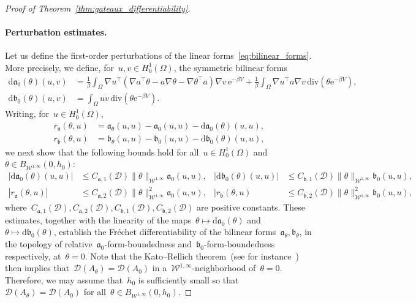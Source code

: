 \documentclass[a4]{article}
\renewcommand{\d}{\mathrm{d}}
\newcommand{\e}{\mathrm{e}}
\renewcommand{\div}{\mathrm{div}}
\newcommand{\fa}{\mathfrak{a}}
\newcommand{\fb}{\mathfrak{b}}
\newcommand{\1}{\mathbbm 1}
\newcommand{\Winf}{{{\cW}^{1,\infty}}}
\newcommand{\cW}{\mathcal{W}}
\begin{document}
\begin{proof}[Proof of Theorem~\ref{thm:gateaux_differentiability}]
    \paragraph{Perturbation estimates.}
    Let us define the first-order perturbations of the linear forms~\eqref{eq:bilinear_forms}. More precisely, we define, for~$u,v\in H_0^1(\Omega)$, the symmetric bilinear forms
    \begin{equation}
        \label{eq:perturbations}
        \begin{aligned}
        \d \fa_0(\theta)(u,v) &= \frac1\beta\int_\Omega \nabla u^\top \left(\nabla a^\top \theta -a\nabla \theta -\nabla\theta^\top a\right)\nabla v\,\e^{-\beta V}+ \frac1\beta \int_\Omega \nabla u^\top a \nabla v\,\div\left(\theta\e^{-\beta V}\right),\\
        \d \fb_0(\theta)(u,v) &= \int_\Omega uv\,\div(\theta \e^{-\beta V}).
        \end{aligned}
    \end{equation}
    Writing, for~$u\in H_0^1(\Omega)$,
    \begin{equation}
        \begin{aligned}
            \label{eq:remainders}
            r_{\fa}(\theta,u) &= \fa_\theta(u,u) - \fa_0(u,u)-\d \fa_0(\theta)(u,u),\\
            r_{\fb}(\theta,u) &= \fb_\theta(u,u) - \fb_0(u,u) - \d \fb_0(\theta)(u,u),
        \end{aligned}
    \end{equation}
    we next show that the following bounds hold for all~$u\in H_0^1(\Omega)$ and~$\theta\in B_{\Winf}(0,h_0)$:
    \begin{equation}
        \label{eq:perturbation_estimates}
        \begin{aligned}
        |\d \fa_0(\theta)(u,u)| &\leq C_{\fa,1}(\mathcal D) \|\theta\|_{\Winf}\fa_0(u,u), &|\d \fb_0(\theta)(u,u)| &\leq C_{\fb,1}(\mathcal D) \|\theta\|_{\Winf}\fb_0(u,u),\\
        |r_{\fa}(\theta,u)|&\leq C_{\fa,2}(\mathcal D)\|\theta\|^2_{\Winf}\fa_0(u,u), &|r_{\fb}(\theta,u)&\leq C_{\fb,2}(\mathcal D)\|\theta\|_{\Winf}^2 \fb_0(u,u),
        \end{aligned}
    \end{equation}
    where~$C_{\fa,1}(\mathcal D),C_{\fa,2}(\mathcal D),C_{\fb,1}(\mathcal D),C_{\fb,2}(\mathcal D)$ are positive constants.
    These estimates, together with the linearity of the maps~$\theta\mapsto \d \fa_0(\theta)$ and~$\theta\mapsto \d \fb_0(\theta)$, establish the Fréchet differentiability of the bilinear forms~$\fa_\theta,\fb_\theta$, in the topology of relative~$\fa_0$-form-boundedness and~$\fb_0$-form-boundedness respectively, at~$\theta=0$. Note that the Kato--Rellich theorem~(see for instance~\cite[Theorem 6.4]{T14}) then implies that~$\mathcal D(A_\theta) = \mathcal D(A_0)$ in a~$\Winf$-neighborhood of~$\theta=0$.
    Therefore, we may assume that~$h_0$ is sufficiently small so that~$\mathcal D(A_\theta)=\mathcal D(A_0)$ for all~$\theta\in B_{\Winf}(0,h_0)$.


\end{proof}
\end{document}
